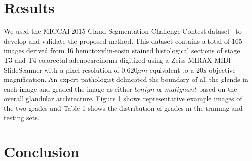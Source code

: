 \documentclass{article}
\begin{document}
\section{Results}
\label{sec:results}
We used the MICCAI 2015 Gland Segmentation Challenge Contest dataset~\cite{Sirinukunwattana2017} to develop and validate the proposed method. This dataset contains a total of 165 images derived from 16 hematoxylin-eosin stained histological sections of stage T3 and T4 colorectal adenocarcinoma digitized using a Zeiss MIRAX MIDI SlideScanner with a pixel resolution of $0.620 \mu m$ equivalent to a 20x objective magnification. An expert pathologist delineated the boundary of all the glands in each image and graded the image as either $benign$ or $malignant$ based on the overall glandular architecture. Figure 1 shows representative example images of the two grades and Table 1 shows the distribution of grades in the training and testing sets.

\section{Conclusion}
\label{sec:conclusion}



\end{document}
